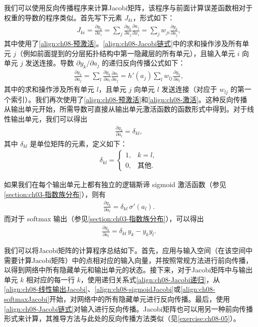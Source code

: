 \documentclass[../../main.tex]{subfiles}
\begin{document}
我们可以使用反向传播程序来计算Jacobi矩阵，该程序与前面计算误差函数相对于权重的导数的程序类似。首先写下元素 $J_{ki}$，形式如下：
\begin{align}
J_{ki}=\frac{\partial y_k}{\partial x_i}=\sum_{j}\frac{\partial y_k}{\partial a_j}\frac{\partial a_j}{\partial x_i}
=\sum_{j}w_{ji}\frac{\partial y_k}{\partial a_j},
\label{align:ch08-Jacobi链式}
\end{align}
其中使用了\eqref{align:ch08-预激活}。\eqref{align:ch08-Jacobi链式}中的求和操作涉及所有单元 $j$（例如前面提到的分层拓扑结构中第一隐藏层的所有单元），且输入单元 $i$ 向单元 $j$ 发送连接。导数 $\partial y_k/\partial a_j$ 的递归反向传播公式如下：
\begin{align}
\frac{\partial y_k}{\partial a_j}=\sum_{l}\frac{\partial y_k}{\partial a_l}\frac{\partial a_l}{\partial a_j}
=h'(a_j)\sum_{l}w_{lj}\frac{\partial y_k}{\partial a_l},
\label{align:ch08-Jacobi递归}
\end{align}
其中的求和操作涉及所有单元 $l$，且单元 $j$ 向单元 $l$ 发送连接（对应于 $w_{lj}$ 的第一个索引）。我们再次使用了\eqref{align:ch08-预激活}和\eqref{align:ch08-激活}。这种反向传播从输出单元开始，所需导数可直接从输出单元激活函数的函数形式中得到。对于线性输出单元，我们可以得出
\begin{align}
\frac{\partial y_k}{\partial a_l}=\delta_{kl},
\label{align:ch08-线性输出Jacobi}
\end{align}
其中 $\delta_{kl}$ 是单位矩阵的元素，定义如下：
\begin{align}
\delta_{kl}=\begin{cases}
1, & k=l,\\
0, & \text{其他}.
\end{cases}
\label{align:ch08-克罗内克}
\end{align}

如果我们在每个输出单元上都有独立的逻辑斯谛 sigmoid 激活函数（参见\cref{section:ch03-指数族分布}），则有
\begin{align}
\frac{\partial y_k}{\partial a_l}=\delta_{kl}\,\sigma'(a_l).
\label{align:ch08-sigmoidJacobi}
\end{align}
而对于 softmax 输出（参见\cref{section:ch03-指数族分布}），可以得出
\begin{align}
\frac{\partial y_k}{\partial a_l}=\delta_{kl}\,y_k-y_k y_l.
\label{align:ch08-softmaxJacobi}
\end{align}

我们可以将Jacobi矩阵的计算程序总结如下。首先，应用与输入空间（在该空间中需要计算Jacobi矩阵）中的点相对应的输入向量，并按照常规方法进行前向传播，以得到网络中所有隐藏单元和输出单元的状态。接下来，对于Jacobi矩阵中与输出单元 $k$ 相对应的每一行 $k$，使用递归关系式\eqref{align:ch08-Jacobi递归}，从\eqref{align:ch08-线性输出Jacobi}、\eqref{align:ch08-sigmoidJacobi}或\eqref{align:ch08-softmaxJacobi}开始，对网络中的所有隐藏单元进行反向传播。最后，使用\eqref{align:ch08-Jacobi链式}对输入进行反向传播。Jacobi矩阵也可以用另一种前向传播形式来计算，其推导方法与此处的反向传播方法类似（见\cref{exercise:ch08-05}）。
\end{document}
